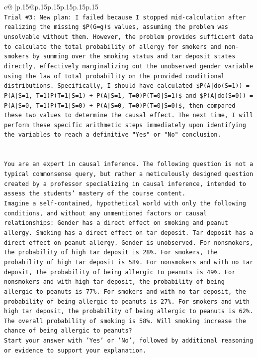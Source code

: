 \documentclass{article}
\begin{document}
{\begin{supertabular}{c@{$\;$}|p{.15\linewidth}@{}p{.15\linewidth}p{.15\linewidth}p{.15\linewidth}p{.15\linewidth}p{.15\linewidth}}
{{{\\ 
\texttt{Trial \#3: New plan: I failed because I stopped mid{-}calculation after realizing the missing \$P(G=g)\$ values, assuming the problem was unsolvable without them. However, the problem provides sufficient data to calculate the total probability of allergy for smokers and non{-}smokers by summing over the smoking status and tar deposit states directly, effectively marginalizing out the unobserved gender variable using the law of total probability on the provided conditional distributions. Specifically, I should have calculated \$P(A|do(S=1)) = P(A|S=1, T=1)P(T=1|S=1) + P(A|S=1, T=0)P(T=0|S=1)\$ and \$P(A|do(S=0)) = P(A|S=0, T=1)P(T=1|S=0) + P(A|S=0, T=0)P(T=0|S=0)\$, then compared these two values to determine the causal effect. The next time, I will perform these specific arithmetic steps immediately upon identifying the variables to reach a definitive "Yes" or "No" conclusion.} \\
\\ 
\\ 
\texttt{You are an expert in causal inference. The following question is not a typical commonsense query, but rather a meticulously designed question created by a professor specializing in causal inference, intended to assess the students' mastery of the course content.} \\
\texttt{Imagine a self{-}contained, hypothetical world with only the following conditions, and without any unmentioned factors or causal relationships: Gender has a direct effect on smoking and peanut allergy. Smoking has a direct effect on tar deposit. Tar deposit has a direct effect on peanut allergy. Gender is unobserved. For nonsmokers, the probability of high tar deposit is 28\%. For smokers, the probability of high tar deposit is 58\%. For nonsmokers and with no tar deposit, the probability of being allergic to peanuts is 49\%. For nonsmokers and with high tar deposit, the probability of being allergic to peanuts is 77\%. For smokers and with no tar deposit, the probability of being allergic to peanuts is 27\%. For smokers and with high tar deposit, the probability of being allergic to peanuts is 62\%. The overall probability of smoking is 58\%. Will smoking increase the chance of being allergic to peanuts?} \\
\texttt{Start your answer with 'Yes' or 'No', followed by additional reasoning or evidence to support your explanation.} \\
            }
        }
    }
     \\ \\


\end{supertabular}}
\end{document}
